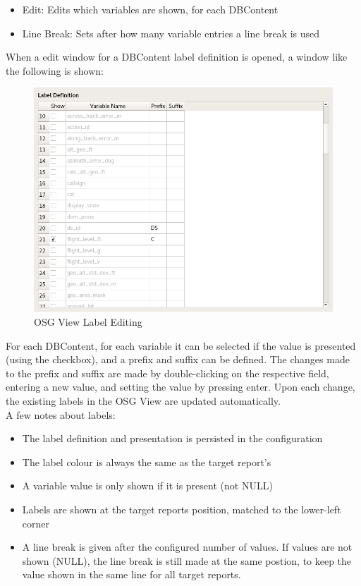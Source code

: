 \begin{itemize}
 \item Edit: Edits which variables are shown, for each DBContent
 \item Line Break: Sets after how many variable entries a line break is used
\end{itemize}

When a edit window for a DBContent label definition is opened, a window like the following is shown:

\begin{figure}[H]
    \includegraphics[width=12cm,frame]{figures/osgview_label_edit.png}
  \caption{OSG View Label Editing}
\end{figure}

For each DBContent, for each variable it can be selected if the value is presented (using the checkbox), and a prefix and suffix can be defined. The changes made to the prefix and suffix are made by double-clicking on the respective field, entering a new value, and setting the value by pressing enter. Upon each change, the existing labels in the OSG View are updated automatically. \\

A few notes about labels:

\begin{itemize}
 \item The label definition and presentation is persisted in the configuration
 \item The label colour is always the same as the target report's
 \item A variable value is only shown if it is present (not NULL)
 \item Labels are shown at the target reports position, matched to the lower-left corner
 \item A line break is given after the configured number of values. If values are not shown (NULL), the line break is still made at the same postion, to keep the value shown in the same line for all target reports.
\end{itemize}

